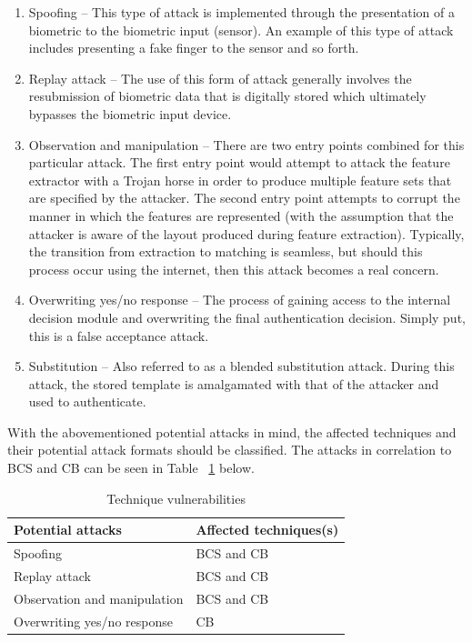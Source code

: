    \begin{enumerate}[label=\roman*.]
    
        \item Spoofing – This type of attack is implemented through the presentation of a   biometric to the biometric input (sensor). An example of this type of attack includes presenting a fake finger to the sensor and so forth.
        \item Replay attack – The use of this form of attack generally involves the resubmission of biometric data that is digitally stored which ultimately bypasses the biometric input device.
        \item Observation and manipulation – There are two entry points combined for this particular attack. The first entry point would attempt to attack the feature extractor with a Trojan horse in order to produce multiple feature sets that are specified by the attacker. The second entry point attempts to corrupt the manner in which the features are represented (with the assumption that the attacker is aware of the layout produced during feature extraction). Typically, the transition from extraction to matching is seamless, but should this process occur using the internet, then this attack becomes a real concern.
        \item Overwriting yes/no response – The process of gaining access to the internal decision module and overwriting the final authentication decision. Simply put, this is a false acceptance attack.
        \item Substitution – Also referred to as a blended substitution attack. During this attack, the stored template is amalgamated with that of the attacker and used to authenticate.

    \end{enumerate}
    
    With the abovementioned potential attacks in mind, the affected techniques and their potential attack formats should be classified. The attacks in correlation to BCS and CB can be seen in Table ~\ref{table:Technique vulnerabilities} below.
    
    
    \begin{table}[h]
    \caption{Technique vulnerabilities}
    \centering
     \begin{tabular}{|p{} | p{}|} 
     \hline
    	\textbf{Potential attacks} & \textbf{Affected techniques(s)} \\ [1ex] 
     \hline\hline 
     Spoofing & BCS and CB  \\[1ex]
     \hline 
     Replay attack & BCS and CB \\[1ex]
     \hline
     Observation and manipulation & BCS and CB\\[1ex]
     \hline           
     Overwriting yes/no response & CB\\[1ex]
     \hline
     \end{tabular}
     \label{table:Technique vulnerabilities}
    \end{table}
    
